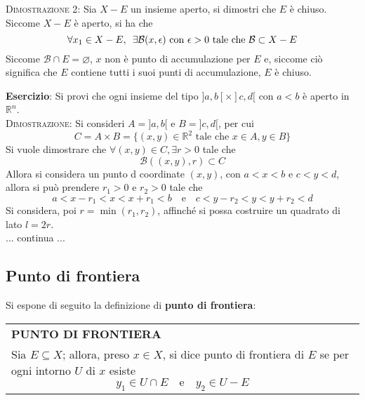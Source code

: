 \documentclass[a4paper]{extarticle}
\renewcommand\arraystretch{}
\begin{document}
\vspace{2em}
\noindent
\normalfont \normalsize
\textsc{Dimostrazione 2}: Sia $X - E$ un insieme aperto, si dimostri che $E$ è chiuso.\\
Siccome $X-E$ è aperto, si ha che
\[\forall x_1 \in X - E, \hspace{0.5em} \exists \mathcal{B}(x,\epsilon) \text{ con } \epsilon>0 \text{ tale che } \mathcal{B} \subset X - E\]
Siccome $\mathcal{B} \cap E = \varnothing$, $x$ non è punto di accumulazione per $E$ e, siccome ciò significa che $E$ contiene tutti i suoi punti di accumulazione, $E$ è chiuso.

\vspace{2em}
\noindent
\textbf{Esercizio}: Si provi che ogni insieme del tipo $]a,b[ \times ]c,d[$ con $a<b$ è aperto in $\mathbb{R}^n$.\\

\vspace{2em}
\noindent
\normalfont \normalsize
\textsc{Dimostrazione}: Si consideri $A=]a,b[$ e $B=]c,d[$, per cui
\[C=A \times B = \{(x,y) \in \mathbb{R}^2 \text{ tale che } x \in A, y \in B\}\]
Si vuole dimostrare che $\forall (x,y) \in C, \exists r > 0$ tale che
\[\mathcal{B} \left((x,y), r\right) \subset C\]
Allora si considera un punto d coordinate $(x,y)$, con $a<x<b$ e $c<y<d$, allora si può prendere $r_1>0$ e $r_2>0$ tale che
\[a < x-r_1 < x < x+r_1 < b \hspace{1em} \text{e} \hspace{1em} c < y-r_2 < y < y+r_2 < d\]
Si considera, poi $r = \min(r_1,r_2)$, affinché si possa costruire un quadrato di lato $l=2r$.\\
... continua ...

\vspace{1em}
\noindent
\subsection{Punto di frontiera}
Si espone di seguito la definizione di \textbf{punto di frontiera}:

\vspace{1em}
\setlength{\tabcolsep}{14pt}
\renewcommand{\arraystretch}{2}
\noindent
\begin{tabularx}{\textwidth}{@{}|P|@{}}
    \hline
    {\textbf{PUNTO DI FRONTIERA}}\\
    \parbox{\linewidth}{Sia $E \subseteq X$; allora, preso $x \in X$, si dice punto di frontiera di $E$ se per ogni intorno $U$ di $x$ esiste
    \[y_1 \in U \cap E \hspace{1em} \text{e} \hspace{1em} y_2 \in U - E\]
    \vspace{-1mm}}\\
    \hline
\end{tabularx}
\end{document}
